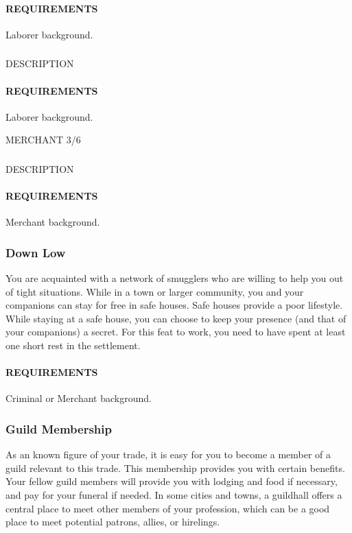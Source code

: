    \paragraph{REQUIREMENTS} Laborer background.

    \subsubsection{} \label{feat::NAME}
    DESCRIPTION
    \paragraph{REQUIREMENTS} Laborer background.

MERCHANT 3/6
    \subsubsection{} \label{feat::NAME}
    DESCRIPTION
    \paragraph{REQUIREMENTS} Merchant background.

    \subsubsection{Down Low} \label{feat::downlow}
    You are acquainted with a network of smugglers who are willing to help you out of tight situations.
    While in a town or larger community, you and your companions can stay for free in safe houses.
    Safe houses provide a poor lifestyle.
    While staying at a safe house, you can choose to keep your presence (and that of your companions) a secret.
    For this feat to work, you need to have spent at least one short rest in the settlement.
    \paragraph{REQUIREMENTS} Criminal or Merchant background.

    \subsubsection{Guild Membership} \label{feat::guildmembership}
    As an known figure of your trade, it is easy for you to become a member of a guild relevant to this trade.
    This membership provides you with certain benefits.
    Your fellow guild members will provide you with lodging and food if necessary, and pay for your funeral if needed.
    In some cities and towns, a guildhall offers a central place to meet other members of your profession, which can be a good place to meet potential patrons, allies, or hirelings.

